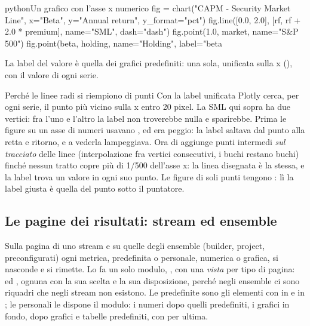 \begin{codiceInterno}{python}{Un grafico con l'asse x numerico}{}
fig = chart("CAPM - Security Market Line", x="Beta", y="Annual return", y_format="pct")
fig.line([0.0, 2.0], [rf, rf + 2.0 * premium], name="SML", dash="dash")
fig.point(1.0, market, name="S&P 500")
fig.point(beta, holding, name="Holding", label="beta %
\end{codiceInterno}

La label del valore è quella dei grafici predefiniti: una sola, unificata
sulla x (), con il valore di ogni serie.

\begin{perche}{Perché le linee radi si riempiono di punti}
Con la label unificata Plotly cerca, per ogni serie, il punto più vicino
sulla x entro 20 pixel. La SML qui sopra ha due vertici: fra l'uno e l'altro
la label non troverebbe nulla e sparirebbe. Prima le figure su un asse di
numeri usavano , ed era peggio: la label saltava dal punto alla
retta e ritorno, e a vederla lampeggiava. Ora  di
 aggiunge punti intermedi \emph{sul tracciato} delle linee
(interpolazione fra vertici consecutivi, i buchi restano buchi) finché
nessun tratto copre più di 1/500 dell'asse x: la linea disegnata è la
stessa, e la label trova un valore in ogni suo punto. Le figure di soli
punti tengono : lì la label giusta è quella del punto sotto il
puntatore.
\end{perche}

\subsection{Le pagine dei risultati: stream ed ensemble}\label{sez:vista-metriche}

Sulla pagina di uno stream e su quelle degli ensemble (builder, project,
preconfigurati) ogni metrica, predefinita o personale, numerica o grafica,
si nasconde e si rimette. Lo fa un solo modulo,
, con una \emph{vista} per tipo di pagina:
 ed , ognuna con la sua scelta e la sua
disposizione, perché negli ensemble ci sono riquadri che negli stream non
esistono. Le predefinite sono gli elementi con  in
 e in ;
le personali le dispone il modulo: i numeri dopo quelli predefiniti, i
grafici in fondo, dopo grafici e tabelle predefiniti, con  per ultima.

